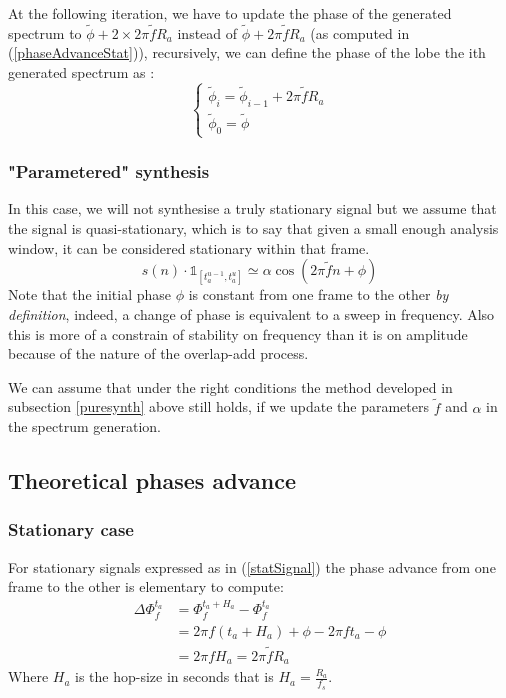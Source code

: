\documentclass[]{article}
\begin{document}
At the following iteration, we have to update the phase of the generated spectrum to $\tilde{\phi} + 2\times2\pi \tilde{f} R_a$ instead of $\tilde{\phi} + 2\pi \tilde{f} R_a$ (as computed in (\ref{phaseAdvanceStat})), recursively, we can define the phase of the lobe the ith generated spectrum as :
\begin{equation}
\begin{cases}
\tilde{\phi}_i = \tilde{\phi}_{i-1} + 2\pi \tilde{f} R_a \\
\tilde{\phi}_0 = \tilde{\phi}
\end{cases}
\end{equation}
\subsubsection{"Parametered" synthesis}
In this case, we will not synthesise a truly stationary signal but we assume that the signal is quasi-stationary, which is to say that given a small enough analysis window, it can be considered stationary within that frame.
\begin{equation}
s(n)\cdot \mathds{1}_{[t_a^{u-1}, t_a^u]} \simeq \alpha \cos(2\pi\tilde{f} n + \phi)
\end{equation}
Note that the initial phase $\phi$ is constant from one frame to the other \emph{by definition}, indeed, a change of phase is equivalent to a sweep in frequency. Also this is more of a constrain of stability on frequency than it is on amplitude because of the nature of the overlap-add process.

We can assume that under the right conditions the method developed in subsection \ref{puresynth} above still holds, if we update the parameters $\tilde{f}$ and $\alpha$ in the spectrum generation.
\subsection{Theoretical phases advance}\label{theoretical_phase_advance}
\subsubsection{Stationary case}
For stationary signals expressed as in (\ref{statSignal}) the phase advance from one frame to the other is elementary to compute:
\begin{equation}\label{phaseAdvanceStat}
\begin{split}
\Delta \Phi_{f}^{t_a} & = \Phi_{f}^{t_a + H_a} - \Phi_{f}^{t_a}\\
& = 2\pi f (t_a + H_a) + \phi - 2\pi f t_a - \phi\\
& = 2\pi f H_a = 2\pi \tilde{f} R_a
\end{split}
\end{equation}
Where $H_a$ is the hop-size in seconds that is $H_a = \frac{R_a}{f_s}$.
\end{document}
